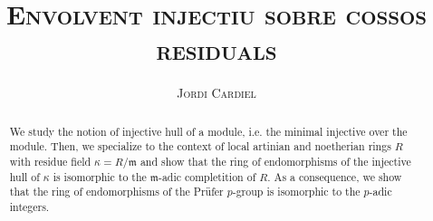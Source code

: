 \documentclass[compress]{article}
\title{\large{\textsc{\textbf{Envolvent injectiu sobre cossos residuals}}}}
\author{\textsc{Jordi Cardiel}}
\date{}
\begin{document}
\maketitle
\begin{abstract}
    We study the notion of injective hull of a module, i.e. the minimal injective over the module. Then, we specialize to the context of local artinian and noetherian rings $R$ with residue field $\kappa=R/\mathfrak{m}$ and show that the ring of endomorphisms of the injective hull of $\kappa$ is isomorphic to the $\mathfrak{m}$-adic completition of $R$. As a consequence, we show that the ring of endomorphisms of the Prüfer $p$-group is isomorphic to the $p$-adic integers.
\end{abstract}
\tableofcontents
\text{ }\\



\printbibliography
\end{document}
